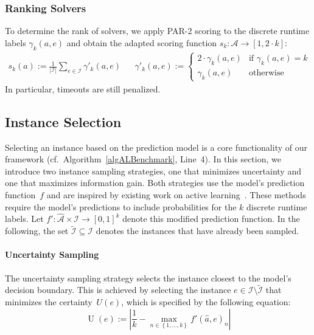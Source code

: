 \documentclass[sn-basic, Numbered]{sn-jnl} %
\begin{document}
\subsubsection{Ranking Solvers}
\label{sec:main:model:ranking}

To determine the rank of solvers, we apply PAR-2 scoring to the discrete runtime labels $\gamma_k(a, e)$ and obtain the adapted scoring function $s_k : \mathcal{A} \rightarrow [1, 2 \cdot k]$:
%
\begin{align}
  s_k(a) := \frac{1}{|\mathcal{I}|} \sum_{e \in \mathcal{I}} \gamma'_k(a, e)
  &&
  \gamma'_k(a, e) := \begin{cases}
    2 \cdot \gamma_k(a, e)   & \text{if } \gamma_k(a, e) = k\\
  \gamma_k(a, e)  & \text{otherwise}
  \end{cases}
  \label{eq:rankingeq}
\end{align}
%
In particular, timeouts are still penalized.

\subsection{Instance Selection}
\label{sec:main:selection}

Selecting an instance based on the prediction model is a core functionality of our framework (cf.~Algorithm~\ref{algALBenchmark}, Line~4).
In this section, we introduce two instance sampling strategies, one that minimizes uncertainty and one that maximizes information gain.
Both strategies use the model's prediction function~$f$ and are inspired by existing work on active learning~\cite{settles2009active}.
These methods require the model's predictions to include probabilities for the $k$ discrete runtime labels.
Let \mbox{$f' : \mathcal{\hat A} \times \mathcal{I} \rightarrow \left[0, 1\right]^k$} denote this modified prediction function.
In the following, the set $\tilde{\mathcal{I}} \subseteq \mathcal{I}$ denotes the instances that have already been sampled.

\paragraph{Uncertainty Sampling}

The uncertainty sampling strategy selects the instance closest to the model's decision boundary.
This is achieved by selecting the instance $e \in \mathcal{I} \setminus \tilde{\mathcal{I}}$ that minimizes the certainty~$U(e)$, which is specified by the following equation:
%
\begin{equation*}
  \operatorname{U}(e) := \left\lvert \frac{1}{k} - \max_{n \in \left\lbrace 1, \dots, k \right\rbrace} f'\!\left(\hat{a}, e\right)_{n} \right\rvert
\end{equation*}
\end{document}

